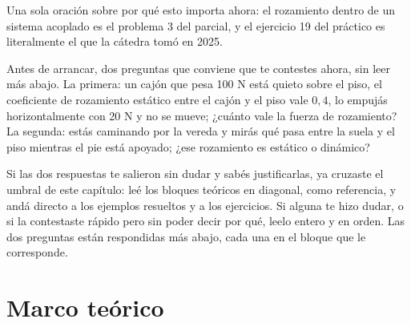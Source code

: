 \documentclass[11pt,openany]{book}
\begin{document}
Una sola oración sobre por qué esto importa ahora: el rozamiento dentro de un sistema acoplado es el problema 3 del parcial, y el ejercicio 19 del práctico es literalmente el que la cátedra tomó en 2025.

Antes de arrancar, dos preguntas que conviene que te contestes ahora, sin leer más abajo. La primera: un cajón que pesa 100 N está quieto sobre el piso, el coeficiente de rozamiento estático entre el cajón y el piso vale $0{,}4$, lo empujás horizontalmente con 20 N y no se mueve; ¿cuánto vale la fuerza de rozamiento? La segunda: estás caminando por la vereda y mirás qué pasa entre la suela y el piso mientras el pie está apoyado; ¿ese rozamiento es estático o dinámico?

Si las dos respuestas te salieron sin dudar y sabés justificarlas, ya cruzaste el umbral de este capítulo: leé los bloques teóricos en diagonal, como referencia, y andá directo a los ejemplos resueltos y a los ejercicios. Si alguna te hizo dudar, o si la contestaste rápido pero sin poder decir por qué, leelo entero y en orden. Las dos preguntas están respondidas más abajo, cada una en el bloque que le corresponde.

\section{Marco teórico}
\end{document}
